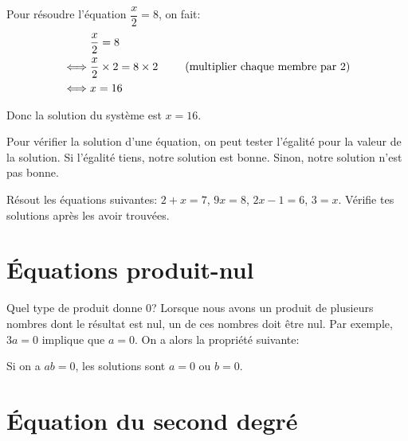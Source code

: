 \begin{exemple}
    Pour résoudre l'équation $\dfrac{x}{2} = 8$, on fait:
    \begin{alignat*}{3}
        & \dfrac{x}{2} = 8&\\
        \iff & \dfrac{x}{2} \times 2 = 8 \times 2& \hspace{5mm} \text{(multiplier chaque membre par 2)}\\
        \iff & x = 16&
    \end{alignat*}

    Donc la solution du système est $x = 16$.
\end{exemple}

\begin{astuce}
    Pour vérifier la solution d'une équation, on peut tester l'égalité pour la valeur de la solution. Si l'égalité tiens, notre solution est bonne. Sinon, notre solution n'est pas bonne.
\end{astuce}

\begin{exercice}
    Résout les équations suivantes: $2 + x = 7$, $9x = 8$, $2x - 1 = 6$, $3 = x$. Vérifie tes solutions après les avoir trouvées.
\end{exercice}


\section{Équations produit-nul}

Quel type de produit donne 0? Lorsque nous avons un produit de plusieurs nombres dont le résultat est nul, un de ces nombres doit être nul. Par exemple, $3a = 0$ implique que $a=0$. On a alors la propriété suivante:

\begin{propriete}
    Si on a $ab = 0$, les solutions sont $a = 0$ ou $b = 0$.
\end{propriete}

\section{Équation du second degré}